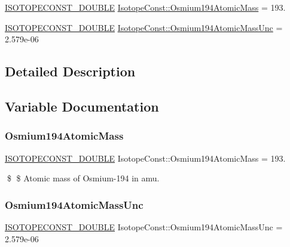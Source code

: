 \begin{DoxyCompactItemize}
\item 
\mbox{\hyperlink{group___isotope_const-_macros_ga8f45a7272ce02c0b4c65c44636ed719a}{I\+S\+O\+T\+O\+P\+E\+C\+O\+N\+S\+T\+\_\+\+D\+O\+U\+B\+LE}} \mbox{\hyperlink{group___isotope_const-_osmium-_os194_ga78053a76111e0d4248cdde71da79f822}{Isotope\+Const\+::\+Osmium194\+Atomic\+Mass}} = 193.
\item 
\mbox{\hyperlink{group___isotope_const-_macros_ga8f45a7272ce02c0b4c65c44636ed719a}{I\+S\+O\+T\+O\+P\+E\+C\+O\+N\+S\+T\+\_\+\+D\+O\+U\+B\+LE}} \mbox{\hyperlink{group___isotope_const-_osmium-_os194_ga60bc9ffa577bb9168f4403133be175a8}{Isotope\+Const\+::\+Osmium194\+Atomic\+Mass\+Unc}} = 2.\+579e-\/06
\end{DoxyCompactItemize}


\subsection{Detailed Description}


\subsection{Variable Documentation}
\mbox{\label{group___isotope_const-_osmium-_os194_ga78053a76111e0d4248cdde71da79f822}} 
\subsubsection{\texorpdfstring{Osmium194\+Atomic\+Mass}{Osmium194AtomicMass}}
{\footnotesize\ttfamily \mbox{\hyperlink{group___isotope_const-_macros_ga8f45a7272ce02c0b4c65c44636ed719a}{I\+S\+O\+T\+O\+P\+E\+C\+O\+N\+S\+T\+\_\+\+D\+O\+U\+B\+LE}} Isotope\+Const\+::\+Osmium194\+Atomic\+Mass = 193.}

\$ \$ Atomic mass of Osmium-\/194 in amu. \mbox{\label{group___isotope_const-_osmium-_os194_ga60bc9ffa577bb9168f4403133be175a8}} 
\subsubsection{\texorpdfstring{Osmium194\+Atomic\+Mass\+Unc}{Osmium194AtomicMassUnc}}
{\footnotesize\ttfamily \mbox{\hyperlink{group___isotope_const-_macros_ga8f45a7272ce02c0b4c65c44636ed719a}{I\+S\+O\+T\+O\+P\+E\+C\+O\+N\+S\+T\+\_\+\+D\+O\+U\+B\+LE}} Isotope\+Const\+::\+Osmium194\+Atomic\+Mass\+Unc = 2.\+579e-\/06}

